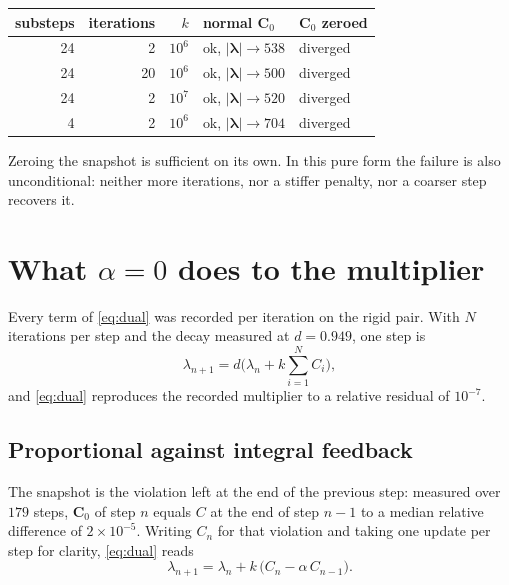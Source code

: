 \documentclass[11pt,a4paper]{article}
\begin{document}
\begin{center}\small
\begin{tabular}{@{}rrrll@{}}
\toprule
substeps & iterations & $k$ & normal $\mathbf{C}_0$ & $\mathbf{C}_0$ zeroed \\
\midrule
24 & 2  & $10^{6}$ & ok, $\lvert\bm{\lambda}\rvert \to 538$ & diverged \\
24 & 20 & $10^{6}$ & ok, $\lvert\bm{\lambda}\rvert \to 500$ & diverged \\
24 & 2  & $10^{7}$ & ok, $\lvert\bm{\lambda}\rvert \to 520$ & diverged \\
4  & 2  & $10^{6}$ & ok, $\lvert\bm{\lambda}\rvert \to 704$ & diverged \\
\bottomrule
\end{tabular}
\end{center}

Zeroing the snapshot is sufficient on its own. In this pure form the failure is also
unconditional: neither more iterations, nor a stiffer penalty, nor a coarser step recovers it.

\section{What $\alpha = 0$ does to the multiplier}
\label{sec:alpha0}

Every term of \eqref{eq:dual} was recorded per iteration on the rigid pair. With $N$ iterations
per step and the decay measured at $d = 0.949$, one step is
\begin{equation}
  \lambda_{n+1} = d\Big(\lambda_n + k\sum_{i=1}^{N} C_i\Big),
  \label{eq:step}
\end{equation}
and \eqref{eq:dual} reproduces the recorded multiplier to a relative residual of $10^{-7}$.

\subsection{Proportional against integral feedback}

The snapshot is the violation left at the end of the previous step: measured over $179$ steps,
$\mathbf{C}_0$ of step $n$ equals $C$ at the end of step $n-1$ to a median relative difference of
$2\times10^{-5}$. Writing $C_n$ for that violation and taking one update per step for clarity,
\eqref{eq:dual} reads
\begin{equation}
  \lambda_{n+1} = \lambda_n + k\,\big(C_n - \alpha\,C_{n-1}\big).
  \label{eq:diff}
\end{equation}
\end{document}
